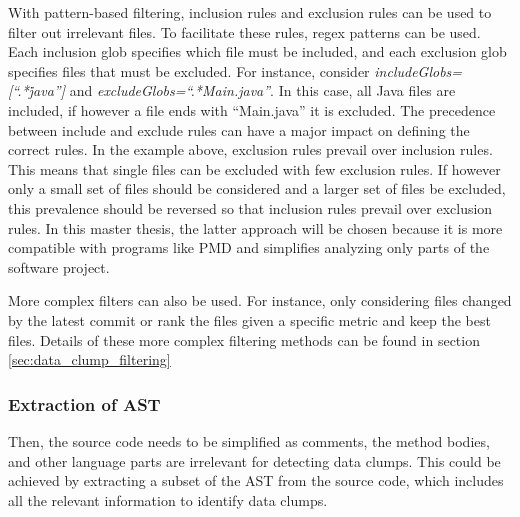 With pattern-based filtering, inclusion rules and exclusion rules can be used to filter out irrelevant files.  To facilitate these rules, regex patterns can be used.  Each inclusion glob specifies which file must be included, and each exclusion glob specifies files that must be excluded. For instance, consider \textit{includeGlobs=[\enquote{.*\.java}]} and \textit{excludeGlobs=\enquote{.*Main.java}}. In this case, all Java files are included, if however a file ends with \enquote{Main.java} it is excluded. 
The precedence between include and exclude rules can have a major impact on defining the correct rules. In the example above, exclusion rules prevail over inclusion rules.  This means that single files can be excluded with few exclusion rules. If however only a small set of files should be considered and a larger set of files be excluded, this prevalence should be reversed so that inclusion rules prevail over exclusion rules. In this master thesis, the latter approach will be chosen because it is more compatible with programs like PMD and simplifies analyzing only parts of the software project. 

More complex filters can also be used. For instance, only considering files changed by the latest commit or rank the files given a specific metric and keep the best files. Details of these more complex filtering methods can be found in section \ref{sec:data_clump_filtering}
\subsubsection{Extraction of AST}
Then,  the source code needs to be simplified as comments, the method bodies, and other language parts are irrelevant for detecting data clumps. This could be achieved by extracting a subset of the \ac{AST} from the source code, which includes all the relevant information to identify data clumps.

\begin{comment}
\subsubsection{Similarity detection}

The next step is finding pairs of method parameters and pairs of identical or at least similar fields. For this, the identifier and the data type can be compared. Unequal variable names might not rule out a similarity between two variables. For instance, typos may happen, or synonyms may be used. Also, the type might be different. For instance, the data type \textit{double} can be seen as a super-set of the datatype \textit{int} because every 32-bit integer can be converted to a \textit{double}.

From this, a graph can be constructed that visualizes the relationship of the several variables. A node represents a parameter or field value, while an edge exists if and only if a relationship between two variables is detected. 
\end{comment}
